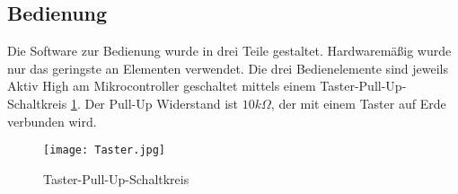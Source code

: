 \subsection{Bedienung}
Die Software zur Bedienung wurde in drei Teile gestaltet. Hardwaremäßig wurde nur das geringste an Elementen verwendet. Die drei Bedienelemente sind jeweils Aktiv High am Mikrocontroller geschaltet mittels einem Taster-Pull-Up-Schaltkreis \ref{fig:SwitchPullUp_Software}. Der Pull-Up Widerstand ist $10k\Omega$, der mit einem Taster auf Erde verbunden wird.

\begin{figure}[h]
	\centering
		\texttt{[image: Taster.jpg]}
	\caption{Taster-Pull-Up-Schaltkreis}
	\label{fig:SwitchPullUp_Software}
\end{figure}


